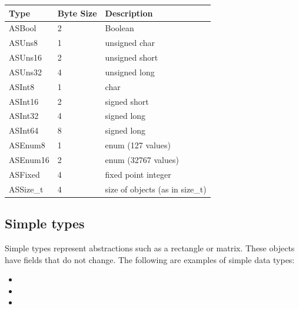 \documentclass[letterpaper,12pt,english,openany,oneside]{sphinxmanual}
\begin{document}
\begin{savenotes}\sphinxattablestart
\centering
{}\label{\detokenize{index:section-1}}\nobreak
\begin{tabulary}{\linewidth}[t]{|T|T|T|}
\hline
\sphinxstyletheadfamily 
Type
&\sphinxstyletheadfamily 
Byte Size
&\sphinxstyletheadfamily 
Description
\\
\hline
ASBool
&
2
&
Boolean
\\
\hline
ASUns8
&
1
&
unsigned char
\\
\hline
ASUns16
&
2
&
unsigned short
\\
\hline
ASUns32
&
4
&
unsigned long
\\
\hline
ASInt8
&
1
&
char
\\
\hline
ASInt16
&
2
&
signed short
\\
\hline
ASInt32
&
4
&
signed long
\\
\hline
ASInt64
&
8
&
signed long
\\
\hline
ASEnum8
&
1
&
enum (127 values)
\\
\hline
ASEnum16
&
2
&
enum (32767 values)
\\
\hline
ASFixed
&
4
&
fixed point integer
\\
\hline
ASSize\_t
&
4
&
size of objects (as in size\_t)
\\
\hline
\end{tabulary}
\par
\sphinxattableend\end{savenotes}


\subsection{Simple types}
\label{\detokenize{index:simple-types}}
Simple types represent abstractions such as a rectangle or matrix. These objects have fields that do not change. The following are examples of simple data types:
\begin{itemize}
\item {} 

\item {} 

\item {} 

\end{itemize}
\end{document}
